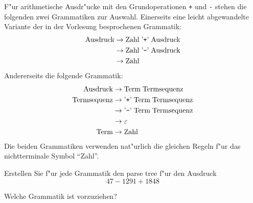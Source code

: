F"ur arithmetische Ausdr"ucke mit den Grundoperationen
{\tt +} und {\tt -} stehen die folgenden zwei Grammatiken
zur Auswahl. Einerseits eine leicht abgewandelte Variante
der in der Vorlesung besprochenen Grammatik:
\begin{align*}
\text{Ausdruck}&\rightarrow \text{Zahl}\;\text{'{\tt +}'}\;\text{Ausdruck} \\
               &\rightarrow \text{Zahl}\;\text{'{\tt -}'}\;\text{Ausdruck} \\
               &\rightarrow \text{Zahl}
\end{align*}
Andererseits die folgende Grammatik:
\begin{align*}
\text{Ausdruck}&\rightarrow \text{Term}\;\text{Termsequenz}\\
\text{Termsequenz}&\rightarrow \text{'{\tt +}'}\; \text{Term}\; \text{Termsequenz}\\
                  &\rightarrow \text{'{\tt -}'}\; \text{Term}\; \text{Termsequenz}\\
                  &\rightarrow \varepsilon\\
 \text{Term}&\rightarrow \text{Zahl}
\end{align*}
Die beiden Grammatiken verwenden nat"urlich die gleichen Regeln
f"ur das nichtterminale Symbol ``Zahl''.
\begin{teilaufgaben}
\item Erstellen Sie f"ur jede Grammatik den parse tree f"ur den Ausdruck
$$
47-1291+1848
$$
\item Welche Grammatik ist vorzuziehen?
\end{teilaufgaben}

